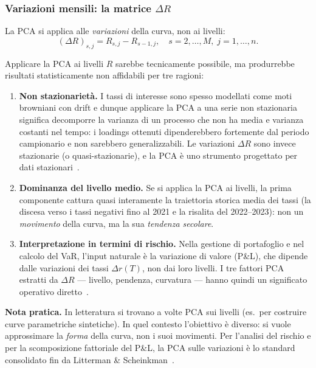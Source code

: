 \documentclass[11pt,a4paper]{article}
\theoremstyle{plain}
\theoremstyle{definition}
\theoremstyle{remark}
\begin{document}
\subsubsection{Variazioni mensili: la matrice \texorpdfstring{$\Delta R$}{Delta R}}

La PCA si applica alle \emph{variazioni} della curva, non ai livelli:
\[
(\Delta R)_{s,j} = R_{s,j} - R_{s-1,j},
\quad s = 2,\ldots,M,\; j = 1,\ldots,n.
\]

\medskip
Applicare la PCA ai livelli $R$ sarebbe tecnicamente possibile, ma
produrrebbe risultati statisticamente non affidabili per tre ragioni:

\begin{enumerate}
  \item \textbf{Non stazionarietà.}
        I tassi di interesse sono spesso modellati come moti browniani con drift e dunque applicare la PCA a una serie
        non stazionaria significa decomporre la varianza di un processo che
        non ha media e varianza costanti nel tempo: i loadings ottenuti
        dipenderebbero fortemente dal periodo campionario e non sarebbero
        generalizzabili. Le variazioni $\Delta R$ sono invece stazionarie
        (o quasi-stazionarie), e la PCA è uno strumento progettato per dati
        stazionari~\cite{litterman1991}.

  \item \textbf{Dominanza del livello medio.}
        Se si applica la PCA ai livelli, la prima componente cattura quasi
        interamente la traiettoria storica media dei tassi (la discesa verso i
        tassi negativi fino al 2021 e la risalita del 2022--2023): non un
        \emph{movimento} della curva, ma la sua \emph{tendenza secolare}.

  \item \textbf{Interpretazione in termini di rischio.}
        Nella gestione di portafoglio e nel calcolo del VaR, l'input naturale
        è la variazione di valore (P\&L), che dipende dalle variazioni dei tassi
        $\Delta r(T)$, non dai loro livelli. I tre fattori PCA estratti da
        $\Delta R$ --- livello, pendenza, curvatura --- hanno quindi un
        significato operativo diretto~\cite{rebonato2004}.
\end{enumerate}

\begin{warningbox}
\textbf{Nota pratica.} In letteratura si trovano a volte PCA sui livelli (es.\ per
costruire curve parametriche sintetiche). In quel contesto l'obiettivo è diverso:
si vuole approssimare la \emph{forma} della curva, non i suoi movimenti. Per
l'analisi del rischio e per la scomposizione fattoriale del P\&L, la PCA sulle
variazioni è lo standard consolidato fin da Litterman \& Scheinkman~\cite{litterman1991}.
\end{warningbox}
\end{document}
